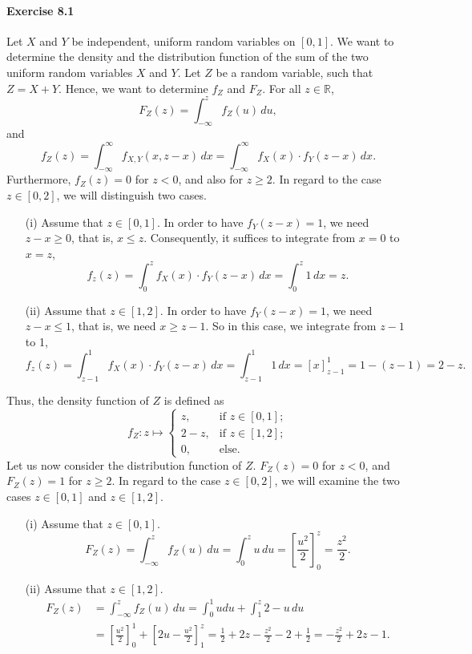 \paragraph{Exercise 8.1} Let $X$ and $Y$ be independent, uniform random variables
on $[0,1]$. We want to determine the density and the distribution function of the
sum of the two uniform random variables $X$ and $Y$. Let $Z$ be a random variable,
such that $Z = X + Y$. Hence, we want to determine $f_Z$ and $F_Z$. For all
$z \in \mathbb{R}$,
\[
    F_Z(z) = \int_{- \infty}^{z} f_Z(u) \, du,
\]
and
\[
    f_Z(z)
        = \int_{- \infty}^{\infty} f_{X,Y}(x,z-x) \, dx
        = \int_{- \infty}^{\infty} f_X(x)\cdot f_Y(z-x) \, dx.
\]
Furthermore, $f_Z(z) = 0$ for $z < 0$, and also for $z \geq 2$. In regard to the
case $z \in [0,2]$, we will distinguish two cases.
\begin{enumerate}
    \item[(i)] Assume that $z \in [0,1]$. In order to have $f_Y(z-x) = 1$, we need
    $z-x \geq 0$, that is, $x \leq z$. Consequently, it suffices to integrate from
    $x=0$ to $x = z$,
    \[
        f_z(z)
            = \int_{0}^{z} f_X(x)\cdot f_Y(z-x) \, dx
            = \int_{0}^{z} 1 \, dx
            = z.
    \]

    \item[(ii)] Assume that $z \in [1,2]$. In order to have $f_Y(z-x) = 1$, we
    need $z-x \leq 1$, that is, we need $x \geq z-1$. So in this case, we integrate
    from $z-1$ to 1,
    \[
    f_z(z)
        = \int_{z-1}^{1} f_X(x)\cdot f_Y(z-x) \, dx
        = \int_{z-1}^{1} 1 \, dx
        = \left[ x \right]_{z-1}^1
        = 1 - (z-1)
        = 2 - z.
    \]
\end{enumerate}
Thus, the density function of $Z$ is defined as
\[
    f_Z: z \mapsto
    \begin{cases}
        z, &\text{if }z  \in [0,1]; \\
        2-z, &\text{if }z \in [1,2]; \\
        0,  &\text{else.}
    \end{cases}
\]
Let us now consider the distribution function of $Z$. $F_Z(z) = 0$ for $z < 0$,
and $F_Z(z) = 1$ for $z \geq 2$. In regard to the case $z \in [0,2]$, we will
examine the two cases $z \in [0,1]$ and $z \in [1,2]$.
\begin{enumerate}
    \item[(i)] Assume that $z \in [0,1]$.
    \[
        F_Z(z)
            = \int_{- \infty}^{z} f_Z(u) \, du
            = \int_{0}^{z} u \, du
            = \left[\frac{u^2}{2}\right]_0^z
            = \frac{z^2}{2}.
    \]

    \item[(ii)] Assume that $z \in [1,2]$.
    \begin{align*}
        F_Z(z)
            &= \int_{- \infty}^{z} f_Z(u) \, du
            = \int_{0}^{1} u du + \int_{1}^{z} 2-u \, du \\
            &= \left[\frac{u^2}{2}\right]_0^1 + \left[2u -  \frac{u^2}{2}\right]_1^z
            = \frac{1}{2} + 2z - \frac{z^2}{2} - 2 + \frac{1}{2}
            = - \frac{z^2}{2} + 2z - 1.
    \end{align*}
\end{enumerate}
